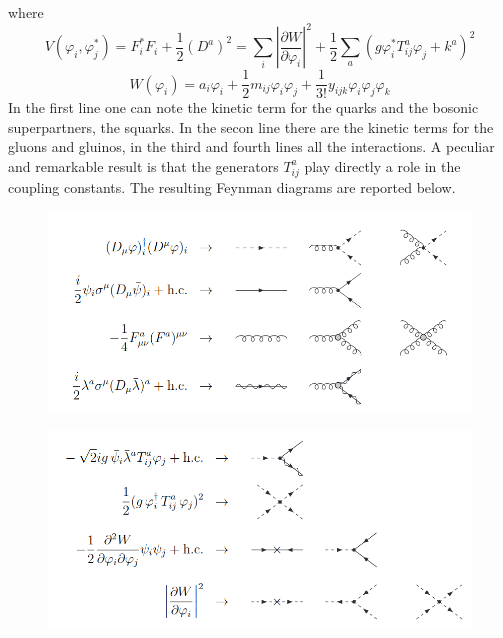 \documentclass[12pt]{article}
\begin{document}
where 
\begin{equation*}
    V\left(\varphi_{i}, \varphi_{j}^{*}\right)=F_{i}^{*} F_{i}+\frac{1}{2}\left(D^{a}\right)^{2}=\sum_{i}\left|\frac{\partial W}{\partial \varphi_{i}}\right|^{2}+\frac{1}{2} \sum_{a}\left(g \varphi_{i}^{*} T_{i j}^{a} \varphi_{j}+k^{a}\right)^{2}
\end{equation*}
\begin{equation*}
    W\left(\varphi_{i}\right)=a_{i} \varphi_{i}+\frac{1}{2} m_{i j} \varphi_{i} \varphi_{j}+\frac{1}{3 !} y_{i j k} \varphi_{i} \varphi_{j} \varphi_{k}
\end{equation*}
In the first line one can note the kinetic term for the quarks and the bosonic superpartners, the squarks. In the secon line there are the kinetic terms for the gluons and gluinos, in the third and fourth lines all the interactions. A peculiar and remarkable result is that the generators $T^a_{ij}$ play directly 
a role in the coupling constants. The resulting Feynman diagrams are reported below.
\begin{figure}[h]
  \centering 
  \includegraphics[scale=0.35]{sqcd_inter_2.png}
\end{figure}
\begin{figure}[h]
  \centering 
  \includegraphics[scale=0.35]{sqcd_inter_1.png}
\end{figure}
\end{document}
